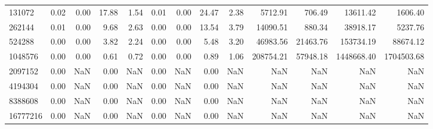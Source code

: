 \begin{tabular}{lrrrrrrrrrrrr}
131072 & 0.02 & 0.00 & 17.88 & 1.54 & 0.01 & 0.00 & 24.47 & 2.38 & 5712.91 & 706.49 & 13611.42 & 1606.40 \\
262144 & 0.01 & 0.00 & 9.68 & 2.63 & 0.00 & 0.00 & 13.54 & 3.79 & 14090.51 & 880.34 & 38918.17 & 5237.76 \\
524288 & 0.00 & 0.00 & 3.82 & 2.24 & 0.00 & 0.00 & 5.48 & 3.20 & 46983.56 & 21463.76 & 153734.19 & 88674.12 \\
1048576 & 0.00 & 0.00 & 0.61 & 0.72 & 0.00 & 0.00 & 0.89 & 1.06 & 208754.21 & 57948.18 & 1448668.40 & 1704503.68 \\
2097152 & 0.00 & NaN & 0.00 & NaN & 0.00 & NaN & 0.00 & NaN & NaN & NaN & NaN & NaN \\
4194304 & 0.00 & NaN & 0.00 & NaN & 0.00 & NaN & 0.00 & NaN & NaN & NaN & NaN & NaN \\
8388608 & 0.00 & NaN & 0.00 & NaN & 0.00 & NaN & 0.00 & NaN & NaN & NaN & NaN & NaN \\
16777216 & 0.00 & NaN & 0.00 & NaN & 0.00 & NaN & 0.00 & NaN & NaN & NaN & NaN & NaN \\
\bottomrule
\end{tabular}
